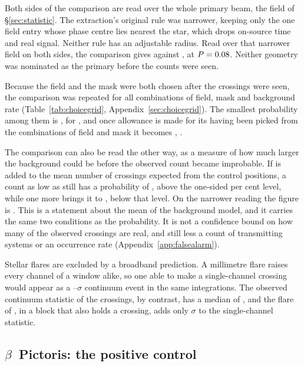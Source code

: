 Both sides of the comparison are read over the whole primary beam, the field
of \S\ref{sec:statistic}. The extraction's original rule was narrower,
keeping only the one field entry whose phase centre lies nearest the star,
which drops on-source time and real signal. Neither rule has an adjustable
radius. Read over that narrower field on both sides, the comparison gives
\FrNarrowObs{} against \FrNarrowExp{}, at $P=0.08$. Neither geometry
was nominated as the primary before the counts were seen.

Because the field and the mask were both chosen after the crossings were
seen, the comparison was repeated for all \CgNCellWord{} combinations of
field, mask and background rate (Table~\ref{tab:choicegrid},
Appendix~\ref{sec:choicegrid}). The smallest probability among them is
\CgMinProb, for \CgMinCell, and once allowance is made for its having been
picked from the \CgNTrialWord{} combinations of field and mask it becomes
\CgBonfProb, \CgVerdictClause.

The comparison can also be read the other way, as a measure of how much
larger the background could be before the observed count became improbable.
If \CeAddLim{} is added to the mean number of crossings expected from the
control positions, a count as low as \CeObs{} still has a probability of
\CeProbAtLim, above the one-sided \CeAlphaPct{} per cent level, while one
more brings it to \CeProbAboveLim, below that level. On the narrower
reading the figure is \FrNarrowAddLim. This is a statement about the mean of
the background model, and it carries the same two conditions as the
probability. It is not a confidence bound on how many of the observed
crossings are real, and still less a count of transmitting systems or an
occurrence rate (Appendix~\ref{app:falsealarm}).

Stellar flares are excluded by a broadband prediction. A millimetre flare
raises every channel of a window alike, so one able to make a single-channel
crossing would appear as a \FlPredLo--\FlPredHi$\sigma$ continuum event in
the same integrations. The observed continuum statistic of the crossings, by
contrast, has a median of \FlObsMed, and the \FlEgStar{} flare of
\citet{MacGregor2020}, in a block that also holds a crossing, adds only
\FlEgContrib$\sigma$ to the single-channel statistic.

\subsection{$\beta$~Pictoris: the positive control}
\label{sec:bpicval}

